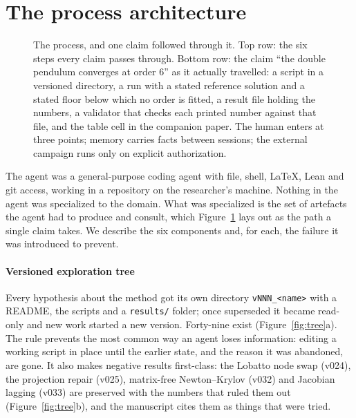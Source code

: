 \section{The process architecture}
\label{sec:system}

\begin{figure}[t]
  \centering
  \caption{The process, and one claim followed through it. Top row: the six steps every claim
  passes through. Bottom row: the claim ``the double pendulum converges at order 6'' as it
  actually travelled: a script in a versioned directory, a run with a stated reference solution
  and a stated floor below which no order is fitted, a result file holding the numbers, a
  validator that checks each printed number against that file, and the table cell in the companion
  paper. The human enters at three points; memory carries facts between sessions; the external
  campaign runs only on explicit authorization.}
  \label{fig:process}
\end{figure}

The agent was a general-purpose coding agent \citep{anthropic2025claudecode} with file, shell,
LaTeX, Lean and git access, working in a repository on the researcher's machine. Nothing in the
agent was specialized to the domain. What was specialized is the set of artefacts the agent had to
produce and consult, which Figure~\ref{fig:process} lays out as the path a single claim takes. We
describe the six components and, for each, the failure it was introduced to prevent.

\paragraph{Versioned exploration tree}
Every hypothesis about the method got its own directory \texttt{vNNN\_<name>} with a README, the
scripts and a \texttt{results/} folder; once superseded it became read-only and new work started a
new version. Forty-nine exist (Figure~\ref{fig:tree}a). The rule prevents the most common way an
agent loses information: editing a working script in place until the earlier state, and the reason
it was abandoned, are gone. It also makes negative results first-class: the Lobatto node swap
(v024), the projection repair (v025), matrix-free Newton--Krylov (v032) and Jacobian lagging
(v033) are preserved with the numbers that ruled them out (Figure~\ref{fig:tree}b), and the
manuscript cites them as things that were tried.

